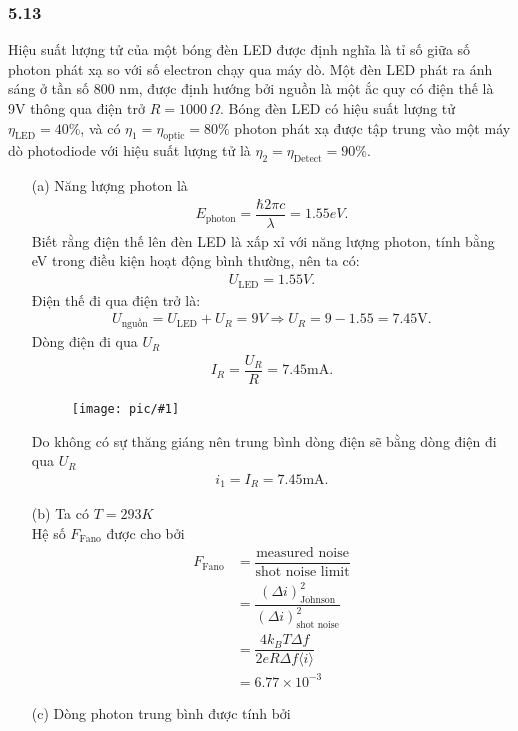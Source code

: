 \documentclass{report}
\newcommand{\image}[1]{
\begin{figure}[H]
	\centering
	\texttt{[image: pic/\#1]}
	\label{#1}
\end{figure}
}
\newcommand{\f}[2]{\dfrac{#1}{#2}}
\begin{document}
\subsubsection*{5.13}
Hiệu suất lượng tử của một bóng đèn LED được định nghĩa là tỉ số giữa số photon phát xạ so với số electron chạy qua máy dò. Một đèn LED phát ra ánh sáng ở tần số 800 nm, được định hướng bởi nguồn là một ắc quy có điện thế là 9V thông qua điện trở $R = 1000 \, \Omega$. Bóng đèn LED có hiệu suất lượng tử $\eta_{\text{LED}} = 40\%$, và có $\eta_{1} = \eta_{\text{optic}} = 80\%$ photon phát xạ được tập trung vào một máy dò photodiode với hiệu suất lượng tử là $\eta_{2} =\eta_{\text{Detect}} = 90\%$.
\begin{enumerate}
	\item[(a)] Năng lượng photon là
	\begin{align*}
		E_{\text{photon}} = \f{\hbar 2 \pi c}{\lambda} = 1.55eV.
	\end{align*}
	Biết rằng điện thế lên đèn LED là xấp xỉ với năng lượng photon, tính bằng eV trong điều kiện hoạt động bình thường, nên ta có:
	\begin{align*}
		U_{\text{LED}} = 1.55 V.
	\end{align*}
	Điện thế đi qua điện trở là:
	\begin{align*}
		U_{\text{nguồn}} = U_{\text{LED}} + U_{R} = 9 V \Rightarrow U_{R} = 9 - 1.55 = 7.45 \text{V}.
	\end{align*}
	Dòng điện đi qua $U_{R}$
	\begin{align*}
		I_{R} = \f{U_{R}}{R} = 7.45 \text{mA}.
	\end{align*}
	\image{circuit.png}
	Do không có sự thăng giáng nên trung bình dòng điện sẽ bằng dòng điện đi qua $U_{R}$
	\begin{align*}
		i_{1} = I_{R} = 7.45 \text{mA}.
	\end{align*}
	\item[(b)] Ta có $T = 293 K$\\
	Hệ số $F_{\text{Fano}}$ được cho bởi
	\begin{align*}
		F_{\text{Fano}}
		& = \f{\text{measured noise}}{\text{shot noise limit}}                  \\
		& = \f{(\Delta i)_{\text{Johnson}}^2}{(\Delta i)_{\text{shot noise}}^2} \\
		& = \f{4 k_B T \Delta f}{2e R \Delta f \langle i \rangle}               \\
		& = 6.77 \times 10^{-3}
	\end{align*}
	\item[(c)] Dòng photon trung bình được tính bởi

\end{enumerate}
\end{document}
